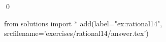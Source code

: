
\begin{ex} 
  \label{ex:rational14}
  
  \qed
\end{ex} 
\begin{python0}
from solutions import *
add(label="ex:rational14",
    srcfilename='exercises/rational14/answer.tex') 
\end{python0}

